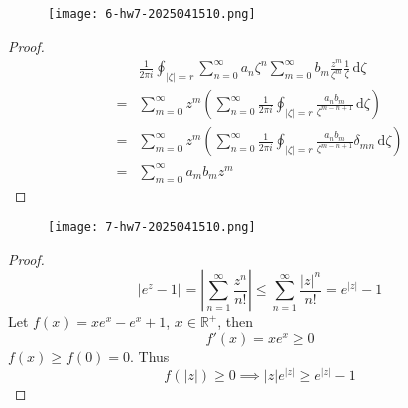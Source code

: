 \begin{exercise}
\begin{figure}[H]
\centering
\texttt{[image: 6-hw7-2025041510.png]}
\label{}
\end{figure}
\end{exercise}
\begin{proof}
\[
\begin{aligned}
 & \frac{1}{2\pi i }\oint_{\lvert \zeta \rvert =r} \sum_{n=0}^{\infty} a_n\zeta^{n}\sum_{m=0}^{\infty} b_m\frac{z^{m}}{\zeta^{m}}\frac{1}{\zeta}  \, \mathrm{d}\zeta   \\
= & \sum_{m=0}^{\infty} z^{m}\left( \sum_{n=0}^{\infty} \frac{1}{2\pi i} \oint_{\lvert \zeta \rvert =r} \frac{a_nb_m}{\zeta^{m-n+1}} \, \mathrm{d}\zeta  \right) \\
= & \sum_{m=0}^{\infty} z^{m}\left( \sum_{n=0}^{\infty} \frac{1}{2\pi i} \oint_{\lvert \zeta \rvert =r} \frac{a_nb_m}{\zeta^{m-n+1}} \delta_{mn}\, \mathrm{d}\zeta  \right) \\
= & \sum_{m=0}^{\infty} a_mb_mz^{m}
\end{aligned}
\]
\end{proof}

\begin{exercise}
\begin{figure}[H]
\centering
\texttt{[image: 7-hw7-2025041510.png]}
\label{}
\end{figure}
\end{exercise}
\begin{proof}
\[
\lvert e^{ z }-1 \rvert =\left\lvert  \sum_{n=1}^{\infty} \frac{z^{n}}{n!}  \right\rvert \leq \sum_{n=1}^{\infty} \frac{\lvert z \rvert ^{n}}{n!}=e^{ \lvert z \rvert  }-1
\]
Let $f(x)=xe^{ x }-e^{ x }+1$, $x\in \mathbb{R}^{+}$, then
\[
f'(x)=xe^{ x }\geq 0
\]
$f(x)\geq f(0)=0$. Thus
\[
f(\lvert z \rvert )\geq 0\implies \lvert z \rvert e^{ \lvert z \rvert  }\geq e^{ \lvert z \rvert  }-1
\]
\end{proof}

